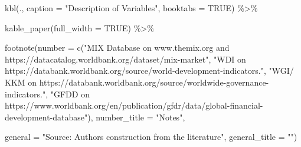 \documentclass[a4paper,nobind]{templates/ociamthesis}
\newenvironment{Shaded}{\begin{snugshade}}{\end{snugshade}}
\newcommand{\AttributeTok}[1]{\textcolor[rgb]{0.77,0.63,0.00}{#1}}
\newcommand{\ConstantTok}[1]{\textcolor[rgb]{0.00,0.00,0.00}{#1}}
\newcommand{\FunctionTok}[1]{\textcolor[rgb]{0.00,0.00,0.00}{#1}}
\newcommand{\NormalTok}[1]{#1}
\newcommand{\SpecialCharTok}[1]{\textcolor[rgb]{0.00,0.00,0.00}{#1}}
\newcommand{\StringTok}[1]{\textcolor[rgb]{0.31,0.60,0.02}{#1}}
\renewenvironment{Shaded}
{
  \vspace{10pt}%
  \begin{snugshade}%
}{%
  \end{snugshade}%
  \vspace{8pt}%
}
\begin{document}
\begin{Shaded}
\begin{Highlighting}[]
  \FunctionTok{kbl}\NormalTok{(., }\AttributeTok{caption =} \StringTok{"Description of Variables"}\NormalTok{, }\AttributeTok{booktabs =} \ConstantTok{TRUE}\NormalTok{) }\SpecialCharTok{\%\textgreater{}\%} 
  
  \FunctionTok{kable\_paper}\NormalTok{(}\AttributeTok{full\_width =} \ConstantTok{TRUE}\NormalTok{) }\SpecialCharTok{\%\textgreater{}\%} 
  
  \FunctionTok{footnote}\NormalTok{(}\AttributeTok{number =} \FunctionTok{c}\NormalTok{(}\StringTok{"MIX Database on www.themix.org and https://datacatalog.worldbank.org/dataset/mix{-}market"}\NormalTok{, }\StringTok{"WDI on https://databank.worldbank.org/source/world{-}development{-}indicators."}\NormalTok{, }\StringTok{"WGI/ KKM on https://databank.worldbank.org/source/worldwide{-}governance{-}indicators."}\NormalTok{, }\StringTok{"GFDD on https://www.worldbank.org/en/publication/gfdr/data/global{-}financial{-}development{-}database"}\NormalTok{), }\AttributeTok{number\_title =} \StringTok{"Notes"}\NormalTok{,}
    
           \AttributeTok{general =} \StringTok{"Source: Authors\textquotesingle{} construction from the literature"}\NormalTok{,}
           \AttributeTok{general\_title =} \StringTok{""}\NormalTok{)}
\end{Highlighting}
\end{Shaded}
\end{document}
